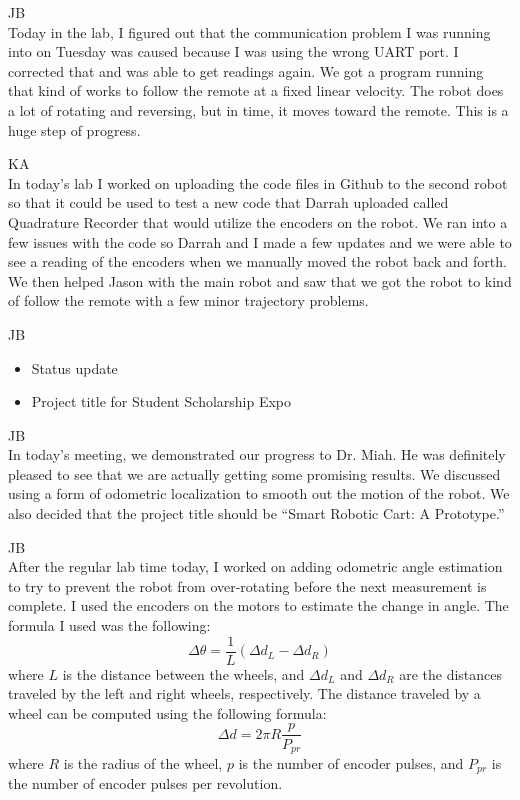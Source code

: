 \documentclass[fontsize=11pt, %
                             paper=letter, %
                             openany, %
                             captions=tableheading,
                             index=totoc,
                             hyperref]{labbook}
\begin{document}
\begin{addmargin}[0cm]{0cm}
JB\\
Today in the lab, I figured out that the communication problem I was running into on Tuesday was caused because I was using the wrong UART port. I corrected that and was able to get readings again. We got a program running that kind of works to follow the remote at a fixed linear velocity. The robot does a lot of rotating and reversing, but in time, it moves toward the remote. This is a huge step of progress.

\vspace*{12pt}
KA\\
In today's lab I worked on uploading the code files in Github to the second robot so that it could be used to test a new code that Darrah uploaded called Quadrature Recorder that would utilize the encoders on the robot. We ran into a few issues with the code so Darrah and I made a few updates and we were able to see a reading of the encoders when we manually moved the robot back and forth. We then helped Jason with the main robot and saw that we got the robot to kind of follow the remote with a few minor trajectory problems.

JB\\
\begin{itemize}
    \item Status update
    \item Project title for Student Scholarship Expo
\end{itemize}

JB\\
In today's meeting, we demonstrated our progress to Dr. Miah. He was definitely pleased to see that we are actually getting some promising results. We discussed using a form of odometric localization to smooth out the motion of the robot. We also decided that the project title should be ``Smart Robotic Cart: A Prototype.''

JB\\
After the regular lab time today, I worked on adding odometric angle estimation to try to prevent the robot from over-rotating before the next measurement is complete. I used the encoders on the motors to estimate the change in angle. The formula I used was the following:
$$\Delta \theta = \frac{1}{L}(\Delta d_L - \Delta d_R)$$
where $L$ is the distance between the wheels, and $\Delta d_L$ and $\Delta d_R$ are the distances traveled by the left and right wheels, respectively. The distance traveled by a wheel can be computed using the following formula:
$$\Delta d = 2\pi R\frac{p}{P_{pr}}$$
where $R$ is the radius of the wheel, $p$ is the number of encoder pulses, and $P_{pr}$ is the number of encoder pulses per revolution.


\end{addmargin}
\end{document}
